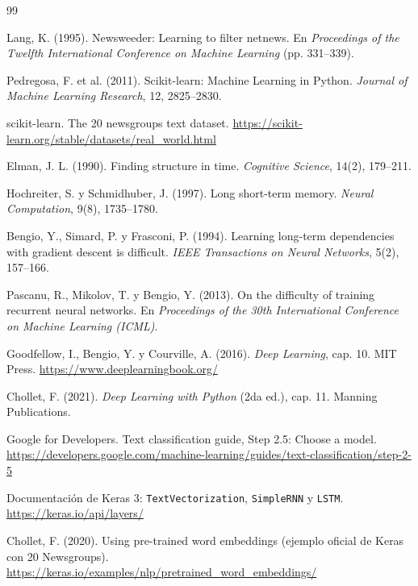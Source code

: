 \documentclass[12pt, a4paper]{article}
\begin{document}
\newpage
\begin{thebibliography}{99}

Lang, K. (1995). Newsweeder: Learning to filter netnews. En \textit{Proceedings of the Twelfth International Conference on Machine Learning} (pp. 331--339).

Pedregosa, F. et al. (2011). Scikit-learn: Machine Learning in Python. \textit{Journal of Machine Learning Research}, 12, 2825--2830.

scikit-learn. The 20 newsgroups text dataset. \url{https://scikit-learn.org/stable/datasets/real_world.html}

Elman, J. L. (1990). Finding structure in time. \textit{Cognitive Science}, 14(2), 179--211.

Hochreiter, S. y Schmidhuber, J. (1997). Long short-term memory. \textit{Neural Computation}, 9(8), 1735--1780.

Bengio, Y., Simard, P. y Frasconi, P. (1994). Learning long-term dependencies with gradient descent is difficult. \textit{IEEE Transactions on Neural Networks}, 5(2), 157--166.

Pascanu, R., Mikolov, T. y Bengio, Y. (2013). On the difficulty of training recurrent neural networks. En \textit{Proceedings of the 30th International Conference on Machine Learning (ICML)}.

Goodfellow, I., Bengio, Y. y Courville, A. (2016). \textit{Deep Learning}, cap. 10. MIT Press. \url{https://www.deeplearningbook.org/}

Chollet, F. (2021). \textit{Deep Learning with Python} (2da ed.), cap. 11. Manning Publications.

Google for Developers. Text classification guide, Step 2.5: Choose a model. \url{https://developers.google.com/machine-learning/guides/text-classification/step-2-5}

Documentación de Keras 3: \texttt{TextVectorization}, \texttt{SimpleRNN} y \texttt{LSTM}. \url{https://keras.io/api/layers/}

Chollet, F. (2020). Using pre-trained word embeddings (ejemplo oficial de Keras con 20 Newsgroups). \url{https://keras.io/examples/nlp/pretrained_word_embeddings/}

\end{thebibliography}
\end{document}
